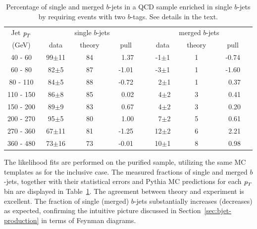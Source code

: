 \begin{table}[!hbt] %
\renewcommand{\arraystretch}{1.2}
\centering
\begin{tabular}{ | c || c | c | c || c | c | c ||}
  \hline
  Jet ${\emph{p}_{T}}$ & \multicolumn{3}{c||}{single $b$-jets}& \multicolumn{3}{c||}{merged $b$-jets}\\ \cline{2-7}
    (GeV) & ~~data~~ & ~theory~ & ~~~pull~~~& ~~data~~ & ~theory~ & ~~~pull~~~\\ \hline
   40 - 60 &  99$\pm$11 & 84   & ~1.37&  -1$\pm$1& 1 &-0.74 \\  
   60 - 80 &  82$\pm$5  &  87  & -1.01&  -3$\pm$1& 1 &-1.60 \\ 
   80 - 110&  84$\pm$5  &  88 &  -0.72&  ~2$\pm$1& 1 &~0.37 \\ 
  110 - 150&  86$\pm$8  &  85 &  ~0.02&  ~4$\pm$2& 3 &~0.41 \\ 
  150 - 200&  89$\pm$9  &  83 &  ~0.67&  ~4$\pm$2& 3 &~0.20 \\ 
  200 - 270&  95$\pm$5  &  80 &  ~1.00&  ~7$\pm$2& 5 &~0.61 \\ 
  270 - 360&  67$\pm$11  &  81 & -1.25&  12$\pm$2& 6 &~2.21 \\ 
  360 - 480&  73$\pm$16  &  73 & -0.01&  10$\pm$1& 8 &~0.98 \\ \hline
\end{tabular}
\caption{Percentage of single  and merged $b$-jets in a QCD sample enriched in single $b$-jets by requiring events with two $b$-tags. See details in the text.} %
\label{tb:fitfractions2btagS}
\end{table}
The likelihood fits are performed on the purified sample, utilizing the same MC templates as for the inclusive case.
The measured fractions of single and merged $b$-jets, together with their statistical errors and {\sc Pythia} MC predictions for each ${\emph{p}_{T}}$ bin are displayed in Table~\ref{tb:fitfractions2btagS}. The agreement between theory and experiment is excellent. The fraction of single (merged) $b$-jets substantially increases (decreases) as expected, confirming the intuitive picture discussed in Section~\ref{sec:bjet-production} in terms of Feynman diagrams.


